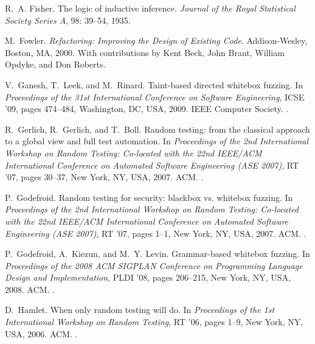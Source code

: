 \documentclass[10pt]{sigplanconf}
\begin{document}
\begin{thebibliography}{35}
R.~A. Fisher.
\newblock The logic of inductive inference.
\newblock \emph{Journal of the Royal Statistical Society Series A},
  98: 39--54, 1935.

M.~Fowler.
\newblock \emph{Refactoring: Improving the Design of Existing Code}.
\newblock Addison-Wesley, Boston, MA, 2000.
\newblock With contributions by Kent Beck, John Brant, William Opdyke, and Don
  Roberts.

V.~Ganesh, T.~Leek, and M.~Rinard.
\newblock Taint-based directed whitebox fuzzing.
\newblock In \emph{Proceedings of the 31st International Conference on Software
  Engineering}, ICSE '09, pages 474--484, Washington, DC, USA, 2009. IEEE
  Computer Society.
\newblock {}.

R.~Gerlich, R.~Gerlich, and T.~Boll.
\newblock Random testing: from the classical approach to a global view and full
  test automation.
\newblock In \emph{Proceedings of the 2nd International Workshop on Random
  Testing: Co-located with the 22nd IEEE/ACM International Conference on
  Automated Software Engineering (ASE 2007)}, RT '07, pages 30--37, New York,
  NY, USA, 2007. ACM.
\newblock {}.

P.~Godefroid.
\newblock Random testing for security: blackbox vs. whitebox fuzzing.
\newblock In \emph{Proceedings of the 2nd International Workshop on Random
  Testing: Co-located with the 22nd IEEE/ACM International Conference on
  Automated Software Engineering (ASE 2007)}, RT '07, pages 1--1, New York, NY,
  USA, 2007. ACM.
\newblock {}.

P.~Godefroid, A.~Kiezun, and M.~Y. Levin.
\newblock Grammar-based whitebox fuzzing.
\newblock In \emph{Proceedings of the 2008 ACM SIGPLAN Conference on
  Programming Language Design and Implementation}, PLDI '08, pages 206--215,
  New York, NY, USA, 2008. ACM.
\newblock {}.

D.~Hamlet.
\newblock When only random testing will do.
\newblock In \emph{Proceedings of the 1st International Workshop on Random
  Testing}, RT '06, pages 1--9, New York, NY, USA, 2006. ACM.
\newblock {}.


\end{thebibliography}
\end{document}

